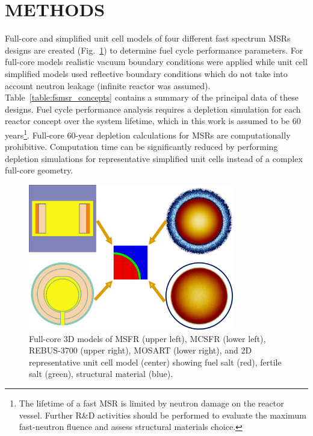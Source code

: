 \documentclass[letterpaper]{mandc2019}
\begin{document}
\section{METHODS}
\label{sec:methods}
Full-core and simplified unit cell models of four different fast spectrum \glspl{MSR} designs are created (Fig.~\ref{fig:unit_cell}) to determine fuel cycle performance parameters. For full-core models realistic vacuum boundary conditions were applied  while unit cell simplified models used reflective boundary conditions which do not take into account neutron leakage (infinite reactor was assumed). Table~\ref{table:fsmsr_concepts} contains a summary of the principal data of these designs. Fuel cycle performance analysis requires a depletion simulation for each reactor concept over the system lifetime, which in this work is assumed to be 60 years\footnote{The lifetime of a fast \gls{MSR} is limited by neutron damage on the reactor vessel. Further R\&D activities should be performed to evaluate the maximum fast-neutron fluence and assess structural materials choice.}. Full-core 60-year depletion calculations for \gls{MSR}s are computationally prohibitive. Computation time can be significantly reduced by performing depletion simulations for representative simplified unit cells instead of a complex full-core geometry.
\begin{figure}[!htb]
  \centering
  \includegraphics[width=0.8\textwidth]{./Figures/fsmsrs.pdf}
  \caption{Full-core 3D models of \gls{MSFR} (upper left), \gls{MCSFR} (lower left), REBUS-3700 (upper right), \gls{MOSART} (lower right), and 2D representative unit cell model (center) showing fuel salt (red), fertile salt (green), structural material (blue).}
  \label{fig:unit_cell}
  \vspace{-0.5in}
\end{figure}
\end{document}
